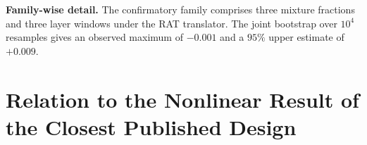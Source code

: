 \documentclass{article} %
\begin{document}
\begin{table}[h]
\centering
\caption{Teacher-content probes on the primary pair, $n{=}30$. The gold column
is the gold-letter probability of the mixture; CHG is against the student's own
prefill. The first row is the student's own cache. Both translators agree that
every probe degrades or is neutral, and that replacing the top third of layers
is neutral.}
\label{tab:probes}
\end{table}

\textbf{Family-wise detail.} The confirmatory family comprises three mixture
fractions and three layer windows under the RAT translator. The joint bootstrap
over $10^4$ resamples gives an observed maximum of $-0.001$ and a $95\%$ upper
estimate of $+0.009$.

\section{Relation to the Nonlinear Result of the Closest Published Design}
\label{app:heo-mlp}
\end{document}
